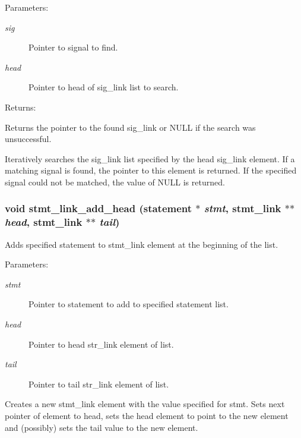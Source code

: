 \begin{Desc}
\item[Parameters: ]\par
\begin{description}
\item[{\em 
sig}]Pointer to signal to find. \item[{\em 
head}]Pointer to head of sig\_\-link list to search. \end{description}
\end{Desc}
\begin{Desc}
\item[Returns: ]\par
Returns the pointer to the found sig\_\-link or NULL if the search was unsuccessful.\end{Desc}
Iteratively searches the sig\_\-link list specified by the head sig\_\-link element. If a matching signal is found, the pointer to this element is returned. If the specified signal could not be matched, the value of NULL is returned. 
\subsubsection{\setlength{\rightskip}{0pt plus 5cm}void stmt\_\-link\_\-add\_\-head ({\bf statement} $\ast$ {\em stmt}, {\bf stmt\_\-link} $\ast$$\ast$ {\em head}, {\bf stmt\_\-link} $\ast$$\ast$ {\em tail})}\label{link_8c_a1}


Adds specified statement to stmt\_\-link element at the beginning of the list.

\begin{Desc}
\item[Parameters: ]\par
\begin{description}
\item[{\em 
stmt}]Pointer to statement to add to specified statement list. \item[{\em 
head}]Pointer to head str\_\-link element of list. \item[{\em 
tail}]Pointer to tail str\_\-link element of list.\end{description}
\end{Desc}
Creates a new stmt\_\-link element with the value specified for stmt. Sets next pointer of element to head, sets the head element to point to the new element and (possibly) sets the tail value to the new element. 
